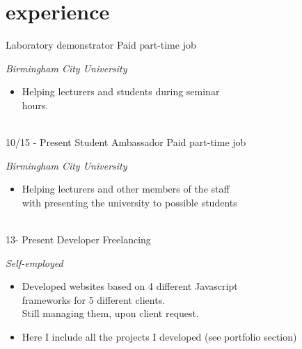 \documentclass[]{friggeri-cv}
\begin{document}
\section{experience}
\begin{entrylist}

    {Laboratory demonstrator}
    {Paid part-time job}
    {
    \emph{Birmingham City University}
    \begin{itemize}
    \item Helping lecturers and students during seminar \\hours.
    \end{itemize}
    }


   
  
 
  \\
  \entry
  {10/15 - Present}
  {Student Ambassador}
  {Paid part-time job}
  {\emph{Birmingham City University} 
    \begin{itemize}
      \item Helping lecturers and other members of the staff \\with presenting the  university to possible students
    \end{itemize}}\\
    
    \entry
  {13- Present}
  {Developer}
  {Freelancing}
  {\emph {Self-employed} 
    \begin{itemize}
      \item Developed websites based on 4 different Javascript \\ frameworks
      for 5 different clients.
      \\Still managing them,  upon client request.
      \item Here I include all the projects I developed (see portfolio section)
    \end{itemize}}\\
  
\end{entrylist}
\end{document}
